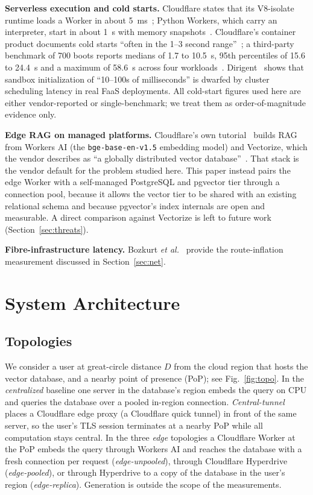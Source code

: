 \documentclass[conference]{IEEEtran}
\newcommand{\code}[1]{\texttt{#1}}
\begin{document}
\textbf{Serverless execution and cold starts.} Cloudflare states that its V8-isolate runtime loads
a Worker in about 5~ms~\cite{cfcoldstart}; Python Workers, which carry an interpreter, start in
about 1~s with memory snapshots~\cite{cfpython}. Cloudflare's container product documents cold
starts ``often in the 1--3 second range''~\cite{cfcontainers}; a third-party benchmark of 700 boots
reports medians of 1.7 to 10.5~s, 95th percentiles of 15.6 to 24.4~s and a maximum of 58.6~s across
four workloads~\cite{alchemy2026}. Dirigent~\cite{dirigent} shows that sandbox initialization of
``10--100s of milliseconds'' is dwarfed by cluster scheduling latency in real FaaS deployments. All
cold-start figures used here are either vendor-reported or single-benchmark; we treat them as
order-of-magnitude evidence only.

\textbf{Edge RAG on managed platforms.} Cloudflare's own tutorial~\cite{cfragtutorial} builds RAG
from Workers AI (the \code{bge-base-en-v1.5} embedding model) and Vectorize, which the vendor
describes as ``a globally distributed vector database''~\cite{cfvectorize}. That stack is the
vendor default for the problem studied here. This paper instead pairs the edge Worker with a
self-managed PostgreSQL and pgvector tier through a connection pool, because it allows the vector
tier to be shared with an existing relational schema and because pgvector's index internals are
open and measurable. A direct comparison against Vectorize is left to future work
(Section~\ref{sec:threats}).

\textbf{Fibre-infrastructure latency.} Bozkurt \emph{et al.}~\cite{bozkurt2018} provide the
route-inflation measurement discussed in Section~\ref{sec:net}.

\section{System Architecture}

\subsection{Topologies}
We consider a user at great-circle distance $D$ from the cloud region that hosts the vector
database, and a nearby point of presence (PoP); see Fig.~\ref{fig:topo}. In the
\emph{centralized} baseline one server in the database's region embeds the query on CPU and
queries the database over a pooled in-region connection. \emph{Central-tunnel} places a Cloudflare
edge proxy (a Cloudflare quick tunnel) in front of the same server, so the user's TLS session terminates at a nearby PoP while
all computation stays central. In the three \emph{edge} topologies a Cloudflare Worker at the PoP
embeds the query through Workers AI and reaches the database with a fresh connection per request
(\emph{edge-unpooled}), through Cloudflare Hyperdrive (\emph{edge-pooled}), or through Hyperdrive
to a copy of the database in the user's region (\emph{edge-replica}). Generation is outside the
scope of the measurements.
\end{document}
